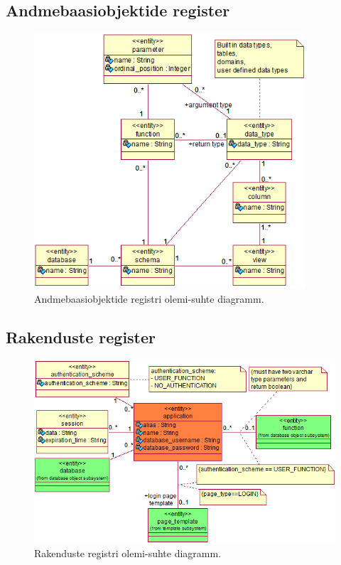 \documentclass[a4paper,12pt]{article} %
\begin{document}
\subsection*{Andmebaasiobjektide register}
\begin{figure}[H]
\centering
\includegraphics[width=0.9\textwidth]{./diagrams/database-object-er-diagram.png}
\caption{Andmebaasiobjektide registri olemi-suhte diagramm.}
\label{fig_andmebaasiobjektide_registri_olemi_suhte_diagramm}
\end{figure}

\subsection*{Rakenduste register}
\begin{figure}[H]
\centering
\includegraphics[width=\textwidth]{./diagrams/applications-er-diagram.png}
\caption{Rakenduste registri olemi-suhte diagramm.}
\label{fig_rakenduste_registri_olemi_suhte_diagramm}
\end{figure}
\end{document}
